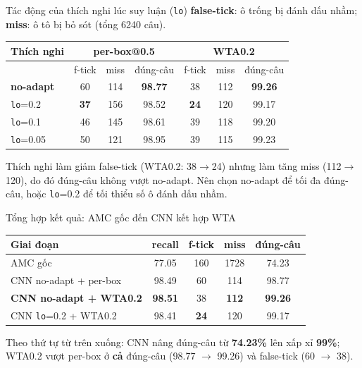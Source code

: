 \documentclass{beamer}
\newcommand{\hl}[1]{\textbf{#1}}
\begin{document}
\begin{frame}{Tác động của thích nghi lúc suy luận (\texttt{lo})}
\scriptsize
\hl{false-tick}: ô trống bị đánh dấu nhầm; \hl{miss}: ô tô bị bỏ sót (tổng 6240 câu).
\begin{center}
\begin{tabular}{|l|c|c|c|c|c|c|}
\hline
\textbf{Thích nghi} &
\multicolumn{3}{c|}{\textbf{per-box@0.5}} &
\multicolumn{3}{c|}{\textbf{WTA0.2}} \\
\hline
 & f-tick & miss & đúng-câu & f-tick & miss & đúng-câu \\
\hline
\hl{no-adapt} & 60 & 114 & \hl{98.77} & 38 & 112 & \hl{99.26} \\
\hline
\texttt{lo}=0.2 & \hl{37} & 156 & 98.52 & \hl{24} & 120 & 99.17 \\
\hline
\texttt{lo}=0.1 & 46 & 145 & 98.61 & 39 & 118 & 99.20 \\
\hline
\texttt{lo}=0.05 & 50 & 121 & 98.95 & 39 & 115 & 99.23 \\
\hline
\end{tabular}
\end{center}
\vspace{0.15cm}
{\footnotesize Thích nghi làm giảm false-tick (WTA0.2: 38$\to$24) nhưng làm tăng miss (112$\to$120), do đó đúng-câu không vượt no-adapt. Nên chọn no-adapt để tối đa đúng-câu, hoặc \texttt{lo}=0.2 để tối thiểu số ô đánh dấu nhầm.}
\end{frame}

\begin{frame}{Tổng hợp kết quả: AMC gốc đến CNN kết hợp WTA}
\footnotesize
\begin{center}
\begin{tabular}{|l|c|c|c|c|}
\hline
\textbf{Giai đoạn} & \textbf{recall} & \textbf{f-tick} & \textbf{miss} & \textbf{đúng-câu} \\
\hline
AMC gốc & 77.05 & 160 & 1728 & 74.23 \\
\hline
CNN no-adapt + per-box & 98.49 & 60 & 114 & 98.77 \\
\hline
\hl{CNN no-adapt + WTA0.2} & \hl{98.51} & 38 & \hl{112} & \hl{99.26} \\
\hline
CNN \texttt{lo}=0.2 + WTA0.2 & 98.41 & \hl{24} & 120 & 99.17 \\
\hline
\end{tabular}
\end{center}
\vspace{0.2cm}
{\scriptsize Theo thứ tự từ trên xuống: CNN nâng đúng-câu từ \hl{74.23\%} lên xấp xỉ \hl{99\%}; WTA0.2 vượt per-box ở \hl{cả} đúng-câu (98.77 $\to$ 99.26) và false-tick (60 $\to$ 38).}
\end{frame}
\end{document}
